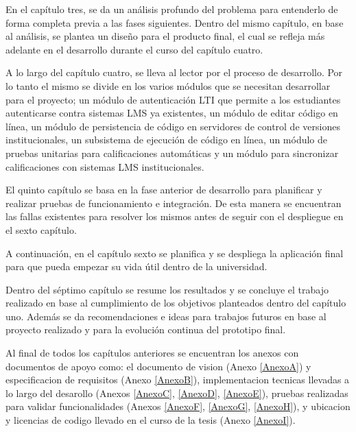 En el capítulo tres, se da un análisis profundo del problema para entenderlo de forma completa previa a las fases siguientes. Dentro del mismo capítulo, en base al análisis, se plantea un diseño para el producto final, el cual se refleja más adelante en el desarrollo durante el curso del capítulo cuatro.

A lo largo del capítulo cuatro, se lleva al lector por el proceso de desarrollo. Por lo tanto el mismo se divide en los varios módulos que se necesitan desarrollar para el proyecto; un módulo de autenticación LTI  que permite a los estudiantes autenticarse contra sistemas LMS  ya existentes, un módulo de editar código en línea, un módulo de persistencia de código en servidores de control de versiones institucionales, un subsistema de ejecución de código en línea, un módulo de pruebas unitarias para calificaciones automáticas y un módulo para sincronizar calificaciones con sistemas LMS  institucionales.
 
El quinto capítulo se basa en la fase anterior de desarrollo para planificar y realizar pruebas de funcionamiento e integración. De esta manera se encuentran las fallas existentes para resolver los mismos antes de seguir con el despliegue en el sexto capítulo.
 
A continuación, en el capítulo sexto se planifica y se despliega la aplicación final para que pueda empezar su vida útil dentro de la universidad.
 
Dentro del séptimo capítulo se resume los resultados y se concluye el trabajo realizado en base al cumplimiento de los objetivos planteados dentro del capítulo uno. Además se da recomendaciones e ideas para trabajos futuros en base al proyecto realizado y para la evolución continua del prototipo final.

Al final de todos los capítulos anteriores se encuentran los anexos con documentos de apoyo como: el documento de vision (Anexo \ref{AnexoA}) y especificacion de requisitos (Anexo \ref{AnexoB}), implementacion tecnicas llevadas a lo largo del desarollo (Anexos \ref{AnexoC}, \ref{AnexoD}, \ref{AnexoE}), pruebas realizadas para validar funcionalidades (Anexos \ref{AnexoF}, \ref{AnexoG}, \ref{AnexoH}), y ubicacion y licencias de codigo llevado en el curso de la tesis (Anexo \ref{AnexoI}).
